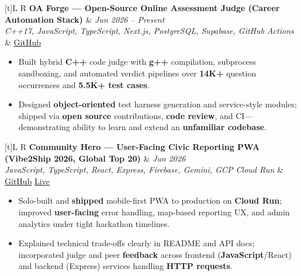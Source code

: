 \documentclass[a4paper,10pt]{article}
\newcommand{\resumeProject}[4]{%
  \vspace{0.5mm}
  \noindent
  \begin{tabularx}{\textwidth}[t]{L R}
    \textbf{#1} & \textit{#3} \\
    \textit{#2} & #4 \\
  \end{tabularx}
  \vspace{-0.5mm}%
}
\begin{document}
\resumeProject
  {OA Forge --- Open-Source Online Assessment Judge (Career Automation Stack)}
  {C++17, JavaScript, TypeScript, Next.js, PostgreSQL, Supabase, GitHub Actions}
  {Jun 2026 -- Present}
  {\href{https://github.com/Ojas-Srivastava05/resume-optimiser}{GitHub}}
\begin{itemize}
  \item Built hybrid \textbf{C++} code judge with \textbf{g++} compilation, subprocess sandboxing, and automated verdict pipelines over \textbf{14K+} question occurrences and \textbf{5.5K+ test cases}.
  \item Designed \textbf{object-oriented} test harness generation and service-style modules; shipped via \textbf{open source} contributions, \textbf{code review}, and CI---demonstrating ability to learn and extend an \textbf{unfamiliar codebase}.
\end{itemize}

\resumeProject
  {Community Hero --- User-Facing Civic Reporting PWA (Vibe2Ship 2026, Global Top 20)}
  {JavaScript, TypeScript, React, Express, Firebase, Gemini, GCP Cloud Run}
  {Jun 2026}
  {\href{https://github.com/Ojas-Srivastava05/community-hero}{GitHub} \textbar{} \href{https://community-hero-987477089222.asia-south1.run.app}{Live}}
\begin{itemize}
  \item Solo-built and \textbf{shipped} mobile-first PWA to production on \textbf{Cloud Run}; improved \textbf{user-facing} error handling, map-based reporting UX, and admin analytics under tight hackathon timelines.
  \item Explained technical trade-offs clearly in README and API docs; incorporated judge and peer \textbf{feedback} across frontend (\textbf{JavaScript}/React) and backend (Express) services handling \textbf{HTTP requests}.
\end{itemize}
\end{document}
